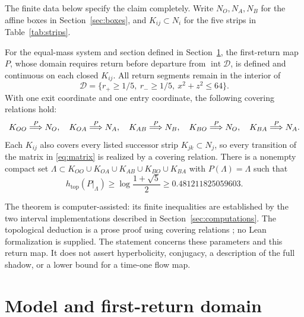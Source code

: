 The finite data below specify the claim completely. Write $N_O,N_A,N_B$ for
the affine boxes in Section~\ref{sec:boxes}, and $K_{ij}\subset N_i$ for the
five strips in Table~\ref{tab:strips}.

\begin{theorem}\label{thm:main}
For the equal-mass system and section defined in Section~\ref{sec:model}, the
first-return map $P$, whose domain requires return before departure from
$\operatorname{int}\mathcal D$, is defined and continuous on each closed
$K_{ij}$. All return segments remain in the interior of
\[
 \mathcal D=\{r_+\geq 1/5,\ r_-\geq 1/5,\ x^2+z^2\leq64\}.
\]
With one exit coordinate and one entry coordinate, the following covering
relations hold:
\begin{equation}\label{eq:five}
 K_{OO}\mathrel{\overset{P}{\Longrightarrow}} N_O,\quad K_{OA}\mathrel{\overset{P}{\Longrightarrow}} N_A,\quad K_{AB}\mathrel{\overset{P}{\Longrightarrow}} N_B,
 \quad K_{BO}\mathrel{\overset{P}{\Longrightarrow}} N_O,\quad K_{BA}\mathrel{\overset{P}{\Longrightarrow}} N_A.
\end{equation}
Each $K_{ij}$ also covers every listed successor strip $K_{jk}\subset N_j$,
so every transition of the matrix in \eqref{eq:matrix} is realized by a
covering relation. There is a nonempty compact set
$\Lambda\subset K_{OO}\cup K_{OA}\cup K_{AB}\cup K_{BO}\cup K_{BA}$ with
$P(\Lambda)=\Lambda$ such that
\begin{equation}\label{eq:entropy}
 h_{\mathrm{top}}(P|_\Lambda)\geq
 \log\frac{1+\sqrt5}{2}\geq0.481211825059603.
\end{equation}
\end{theorem}

The theorem is computer-assisted: its finite inequalities are established by
the two interval implementations described in Section~\ref{sec:computations}.
The topological deduction is a prose proof using covering relations
\cite{ZG}; no Lean formalization is supplied. The statement concerns these
parameters and this return map. It does not assert hyperbolicity, conjugacy,
a description of the full shadow, or a lower bound for a time-one flow map.

\section{Model and first-return domain}\label{sec:model}


